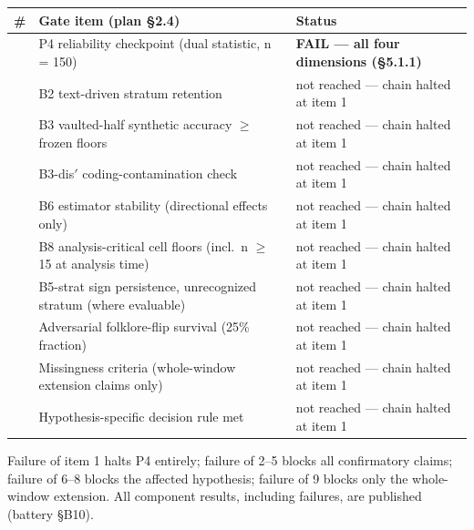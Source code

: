 \begin{longtable}[]{@{}
  >{\raggedright\arraybackslash}p{}
  >{\raggedright\arraybackslash}p{}
  >{\raggedright\arraybackslash}p{}@{}}
\toprule\noalign{}
\begin{minipage}[b]{\linewidth}\raggedright
\#
\end{minipage} & \begin{minipage}[b]{\linewidth}\raggedright
Gate item (plan \S{}2.4)
\end{minipage} & \begin{minipage}[b]{\linewidth}\raggedright
Status
\end{minipage} \\
\midrule\noalign{}
\endhead
\bottomrule\noalign{}
\endlastfoot
1 & P4 reliability checkpoint (dual statistic, n = 150) & \textbf{FAIL --- all four dimensions (\S{}5.1.1)} \\
2 & B2 text-driven stratum retention & not reached --- chain halted at item 1 \\
3 & B3 vaulted-half synthetic accuracy $\ge$ frozen floors & not reached --- chain halted at item 1 \\
4 & B3-dis$'$ coding-contamination check & not reached --- chain halted at item 1 \\
5 & B6 estimator stability (directional effects only) & not reached --- chain halted at item 1 \\
6 & B8 analysis-critical cell floors (incl.~n $\ge$ 15 at analysis time) & not reached --- chain halted at item 1 \\
7 & B5-strat sign persistence, unrecognized stratum (where evaluable) & not reached --- chain halted at item 1 \\
8 & Adversarial folklore-flip survival (25\% fraction) & not reached --- chain halted at item 1 \\
9 & Missingness criteria (whole-window extension claims only) & not reached --- chain halted at item 1 \\
10 & Hypothesis-specific decision rule met & not reached --- chain halted at item 1 \\
\end{longtable}

Failure of item 1 halts P4 entirely; failure of 2--5 blocks all confirmatory claims; failure of 6--8 blocks the affected hypothesis; failure of 9 blocks only the whole-window extension. All component results, including failures, are published (battery \S{}B10).

